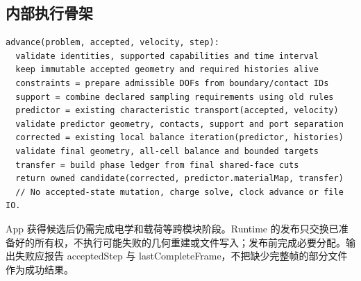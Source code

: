 \documentclass[UTF8,a4paper,11pt,fontset=fandol]{ctexart}
\begin{document}
\subsection{内部执行骨架}
\begin{lstlisting}
advance(problem, accepted, velocity, step):
  validate identities, supported capabilities and time interval
  keep immutable accepted geometry and required histories alive
  constraints = prepare admissible DOFs from boundary/contact IDs
  support = combine declared sampling requirements using old rules
  predictor = existing characteristic transport(accepted, velocity)
  validate predictor geometry, contacts, support and port separation
  corrected = existing local balance iteration(predictor, histories)
  validate final geometry, all-cell balance and bounded targets
  transfer = build phase ledger from final shared-face cuts
  return owned candidate(corrected, predictor.materialMap, transfer)
  // No accepted-state mutation, charge solve, clock advance or file IO.
\end{lstlisting}
App 获得候选后仍需完成电学和载荷等跨模块阶段。Runtime 的发布只交换已准备好的所有权，不执行可能失败的几何重建或文件写入；发布前完成必要分配。输出失败应报告 acceptedStep 与 lastCompleteFrame，不把缺少完整帧的部分文件作为成功结果。
\end{document}
